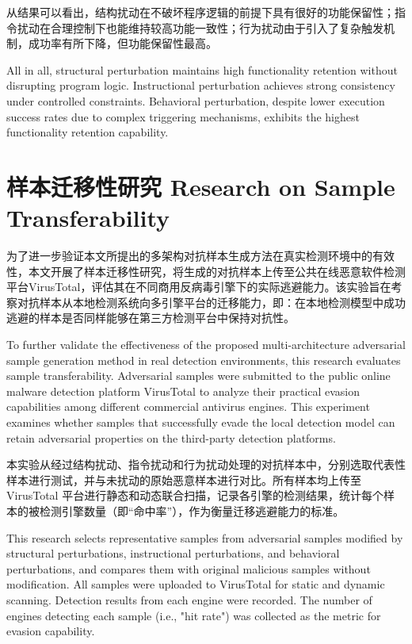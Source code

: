 从结果可以看出，结构扰动在不破坏程序逻辑的前提下具有很好的功能保留性；指令扰动在合理控制下也能维持较高功能一致性；行为扰动由于引入了复杂触发机制，成功率有所下降，但功能保留性最高。

All in all, structural perturbation maintains high functionality retention without disrupting program logic. Instructional perturbation achieves strong consistency under controlled constraints. Behavioral perturbation, despite lower execution success rates due to complex triggering mechanisms, exhibits the highest functionality retention capability.

\section{样本迁移性研究 Research on Sample Transferability}

为了进一步验证本文所提出的多架构对抗样本生成方法在真实检测环境中的有效性，本文开展了样本迁移性研究，将生成的对抗样本上传至公共在线恶意软件检测平台VirusTotal，评估其在不同商用反病毒引擎下的实际逃避能力。该实验旨在考察对抗样本从本地检测系统向多引擎平台的迁移能力，即：在本地检测模型中成功逃避的样本是否同样能够在第三方检测平台中保持对抗性。

To further validate the effectiveness of the proposed multi-architecture adversarial sample generation method in real detection environments, this research evaluates sample transferability. Adversarial samples were submitted to the public online malware detection platform VirusTotal to analyze their practical evasion capabilities among different commercial antivirus engines. This experiment examines whether samples that successfully evade the local detection model can retain adversarial properties on the third-party detection platforms.

本实验从经过结构扰动、指令扰动和行为扰动处理的对抗样本中，分别选取代表性样本进行测试，并与未扰动的原始恶意样本进行对比。所有样本均上传至 VirusTotal 平台进行静态和动态联合扫描，记录各引擎的检测结果，统计每个样本的被检测引擎数量（即“命中率”），作为衡量迁移逃避能力的标准。

This research selects representative samples from adversarial samples modified by structural perturbations, instructional perturbations, and behavioral perturbations, and compares them with original malicious samples without modification. All samples were uploaded to VirusTotal for static and dynamic scanning. Detection results from each engine were recorded. The number of engines detecting each sample (i.e., "hit rate") was collected as the metric for evasion capability.

